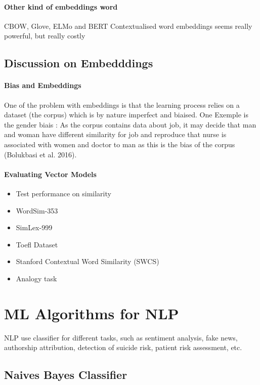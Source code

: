 			\paragraph*{Other kind of embeddings word}
				CBOW, Glove, ELMo and BERT
			Contextualised word embeddings seems really powerful, but really costly

			\subsection{Discussion on Embedddings}

				\paragraph*{Bias and Embeddings}
					One of the problem with embeddings is that the learning process relies on a dataset (the corpus) which is by nature imperfect and biaised. One Exemple is the gender biais : As the corpus contains data about job, it may decide that man and woman have different similarity for job and reproduce that nurse is associated with women and doctor to man as this is the bias of the corpus (Bolukbasi et al. 2016).

				\paragraph*{Evaluating Vector Models}
				\begin{itemize}
				  	\item Test performance on similarity
				  	\item WordSim-353
				  	\item SimLex-999
				  	\item Toefl Dataset
				  	\item Stanford Contextual Word Similarity (SWCS)
				  	\item Analogy task
				  \end{itemize}  


	\section{ML Algorithms for NLP}

		NLP use classifier for different tasks, such as sentiment analysis, fake news, authorship  attribution, detection of suicide risk, patient risk assessment, etc.

		\subsection{Naives Bayes Classifier}

